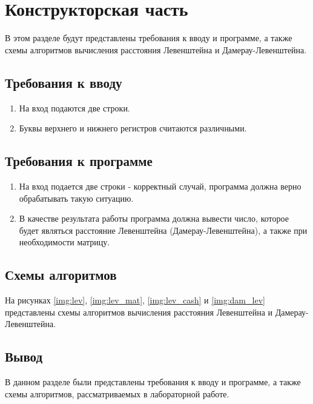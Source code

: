 \chapter{Конструкторская часть}
В этом разделе будут представлены требования к вводу и программе, а также схемы алгоритмов вычисления расстояния Левенштейна и Дамерау-Левенштейна.

\section{Требования к вводу}
\begin{enumerate}
    \item На вход подаются две строки.
    \item Буквы верхнего и нижнего регистров считаются различными.
\end{enumerate}


\section{Требования к программе}
\begin{enumerate}
    \item На вход подается две строки - корректный случай, программа должна верно обрабатывать такую ситуацию.
    \item В качестве результата работы программа должна вывести число, которое будет являться расстояние Левенштейна (Дамерау-Левенштейна), а также при необходимости матрицу.
\end{enumerate}


\section{Схемы алгоритмов}
На рисунках \ref{img:lev}, \ref{img:lev_mat}, \ref{img:lev_cash} и \ref{img:dam_lev} представлены схемы алгоритмов вычисления расстояния Левенштейна и Дамерау-Левенштейна.


\clearpage

\section*{Вывод}
В данном разделе были представлены требования к вводу и программе, а также схемы алгоритмов, рассматриваемых в лабораторной работе.